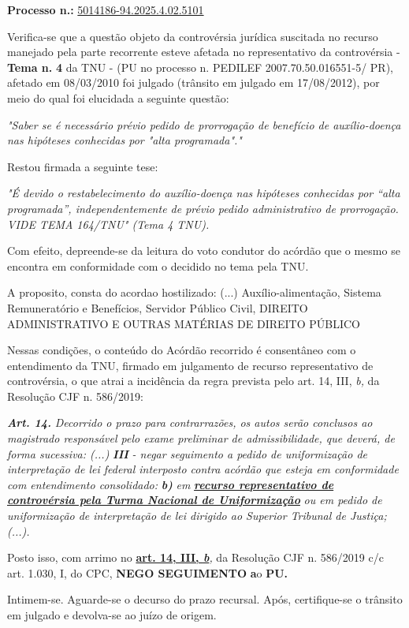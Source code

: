 \documentclass[12pt]{article}
\begin{document}
\justifying
\noindent \textbf{Processo n.: }\uline{5014186-94.2025.4.02.5101}

\noindent Verifica-se que a questão objeto da controvérsia jurídica suscitada no recurso manejado pela parte recorrente esteve afetada no representativo da controvérsia - \textbf{Tema n. }\textbf{4} da TNU - (PU no processo n. PEDILEF 2007.70.50.016551-5/ PR),  afetado em 08/03/2010 foi julgado (trânsito em julgado em 17/08/2012), por meio do qual foi elucidada a seguinte questão:

{\leftskip=3.1cm\rightskip=0.8cm\parindent=0pt \textit{"Saber se é necessário prévio pedido de prorrogação de benefício de auxílio-doença nas hipóteses conhecidas por "alta programada"."}\par}

\noindent Restou firmada a seguinte tese:

{\leftskip=3.1cm\rightskip=0.8cm\parindent=0pt \textit{"É devido o restabelecimento do auxílio-doença nas hipóteses conhecidas por “alta programada”, independentemente de prévio pedido administrativo de prorrogação. VIDE TEMA 164/TNU" (Tema 4 TNU).}\par}

\noindent Com efeito, depreende-se da leitura do voto condutor do acórdão que o mesmo se encontra em conformidade com o decidido no  tema pela TNU.

\noindent A proposito, consta do acordao hostilizado: (...) Auxílio-alimentação, Sistema Remuneratório e Benefícios, Servidor Público Civil, DIREITO ADMINISTRATIVO E OUTRAS MATÉRIAS DE DIREITO PÚBLICO

\noindent Nessas condições, o conteúdo do Acórdão recorrido é consentâneo com o entendimento da TNU, firmado em julgamento de recurso representativo de controvérsia, o que atrai a incidência da regra prevista pelo art. 14, III, \textit{b,} da Resolução CJF n. 586/2019:

\noindent \textit{\textbf{Art. 14.}}\textit{ Decorrido o prazo para contrarrazões, os autos serão conclusos ao magistrado responsável pelo exame preliminar de admissibilidade, que deverá, de forma sucessiva: (...) }\textit{\textbf{III }}\textit{- negar seguimento a pedido de uniformização de interpretação de lei federal interposto contra acórdão que esteja em conformidade com entendimento consolidado: }\textit{\textbf{b)}}\textit{ em }\textit{\textbf{\uline{recurso representativo de controvérsia pela Turma Nacional de Uniformização}}}\textit{ ou em pedido de uniformização de interpretação de lei dirigido ao Superior Tribunal de Justiça;(...).}

\noindent Posto isso, com arrimo no \textbf{\uline{art. 14, III, }}\textit{\textbf{\uline{b}}}\textit{,} da Resolução CJF n. 586/2019 c/c art. 1.030, I, do CPC, \textbf{NEGO SEGUIMENTO }\textbf{a}o\textbf{ PU}\textbf{.}

\noindent Intimem-se. Aguarde-se o decurso do prazo recursal. Após, certifique-se o trânsito em julgado e devolva-se ao juízo de origem.
\end{document}
